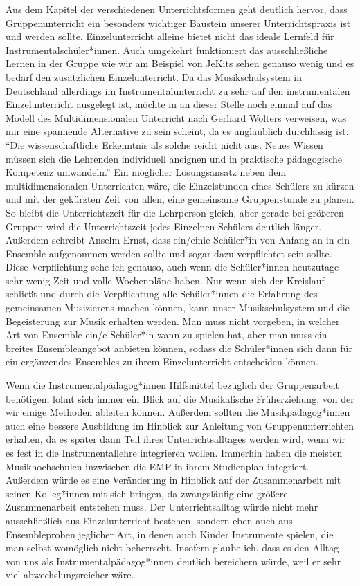Aus dem Kapitel der
verschiedenen Unterrichtsformen geht deutlich hervor, dass Gruppenunterricht ein
besonders wichtiger Baustein unserer Unterrichtspraxis ist und werden sollte.
Einzelunterricht alleine bietet nicht das ideale Lernfeld für
Instrumentalschüler*innen. Auch umgekehrt funktioniert das ausschließliche
Lernen in der Gruppe wie wir am Beispiel von JeKits sehen genauso wenig und es
bedarf den zusätzlichen Einzelunterricht. Da das Musikschulsystem in Deutschland
allerdings im Instrumentalunterricht zu sehr auf den instrumentalen
Einzelunterricht ausgelegt ist, möchte in an dieser Stelle noch einmal auf das
Modell des Multidimensionalen Unterricht nach Gerhard Wolters verweisen, was mir
eine spannende Alternative zu sein scheint, da es unglaublich
durchlässig ist. \enquote{Die wissenschaftliche Erkenntnis als solche reicht
nicht aus. Neues Wissen müssen sich die Lehrenden individuell aneignen und in
praktische pädagogische Kompetenz umwandeln.}
\autocite[10]{losert:die_kunst_zu_unterrichten} Ein möglicher Lösungsansatz
neben dem multidimensionalen Unterrichten wäre, die Einzelstunden eines Schülers
zu kürzen und mit der gekürzten Zeit von allen, eine gemeinsame Gruppenstunde zu
planen. So bleibt die Unterrichtszeit für die Lehrperson gleich, aber gerade bei
größeren Gruppen wird die Unterrichtszeit jedes Einzelnen Schülers deutlich
länger.\autocite[33]{losert:die_kunst_zu_unterrichten} Außerdem schreibt Anselm
Ernst, dass ein/einie Schüler*in von Anfang an in ein Ensemble aufgenommen werden sollte
und sogar dazu verpflichtet sein sollte.
\autocite[61]{ernst:die_zukunftsfaehige_musikschule} Diese Verpflichtung sehe
ich genauso, auch wenn die Schüler*innen heutzutage sehr wenig Zeit und volle
Wochenpläne haben. Nur wenn sich der Kreislauf schließt und durch die
Verpflichtung alle Schüler*innen die Erfahrung des gemeinsamen Musizierens
machen können, kann unser Musikschulsystem und die Begeisterung zur Musik
erhalten werden. Man muss nicht vorgeben, in welcher Art von Ensemble ein/e
Schüler*in wann zu spielen hat, aber man muss ein breites Ensembleangebot
anbieten können, sodass die Schüler*innen sich dann für ein ergänzendes
Ensembles zu ihrem Einzelunterricht entscheiden können.

Wenn die
Instrumentalpädagog*innen Hilfsmittel bezüglich der Gruppenarbeit benötigen,
lohnt sich immer ein Blick auf die Musikalische Früherziehung, von der wir
einige Methoden ableiten können. Außerdem sollten die Musikpädagog*innen auch
eine bessere Ausbildung im Hinblick zur Anleitung von Gruppenunterrichten
erhalten, da es später dann Teil ihres Unterrichtsalltages werden wird, wenn wir
es fest in die Instrumentallehre integrieren wollen. Immerhin haben die meisten
Musikhochschulen inzwischen die EMP in ihrem Studienplan integriert.
Außerdem würde es eine
Veränderung in Hinblick auf der Zusammenarbeit mit seinen Kolleg*innen mit sich
bringen, da zwangsläufig eine größere Zusammenarbeit entstehen muss. Der
Unterrichtsalltag würde nicht mehr ausschließlich aus Einzelunterricht bestehen,
sondern eben auch aus Ensembleproben jeglicher Art, in denen auch Kinder
Instrumente spielen, die man selbst womöglich nicht beherrscht. Insofern glaube
ich, dass es den Alltag von uns als Instrumentalpädagog*innen deutlich
bereichern würde, weil er sehr viel abwechslungsreicher wäre. 

